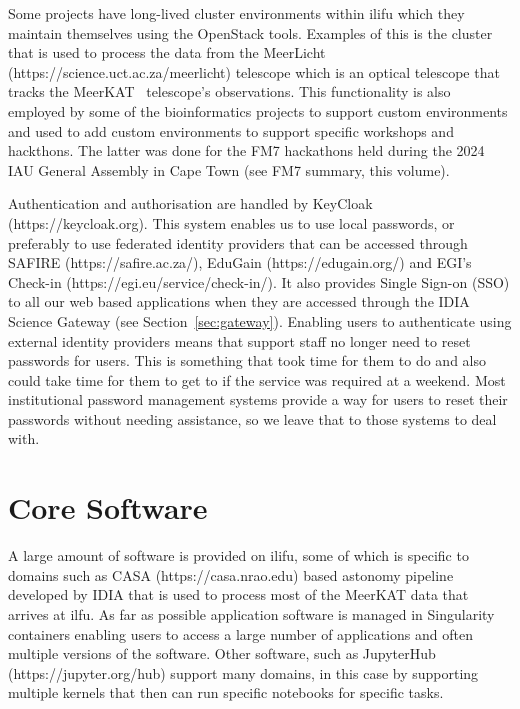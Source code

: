 \documentclass{iau_FM}
\begin{document}
Some projects have long-lived cluster environments within ilifu which they maintain themselves using
the OpenStack tools.
Examples of this is the cluster that is used to process the data from the MeerLicht
 (https://science.uct.ac.za/meerlicht) telescope which
is an optical telescope that tracks the MeerKAT~\cite{meerkat} telescope's observations. 
This functionality
is also employed
by some of the bioinformatics projects to support custom environments and used to add
custom environments to support specific workshops and hackthons. The latter was done for the
 FM7 hackathons held during the 2024 IAU General Assembly in Cape Town (see FM7 summary, this volume). 

Authentication and authorisation are handled by KeyCloak (https://keycloak.org). 
This system enables us 
to use local passwords,
or preferably to use federated identity providers that can be accessed through SAFIRE 
(https://safire.ac.za/), 
EduGain (https://edugain.org/) and EGI's Check-in (https://egi.eu/service/check-in/).
 It also provides Single Sign-on (SSO)
to all our 
web based applications when they are accessed through the 
IDIA Science Gateway (see Section~\ref{sec:gateway}).
Enabling users to authenticate using external identity providers means that support staff no longer need
to reset passwords for users. This is something that took time for them to do and also could take
time for them to get to if the service was required at a weekend. Most institutional password
management systems provide a way for users to reset their passwords without needing assistance,
so we leave that to those systems to deal with.

\section{Core Software}
\label{sec:core_software}

A large amount of software is provided on ilifu, some of which is specific to domains such as {\sc CASA}
(https://casa.nrao.edu) based
astonomy pipeline~\cite{pipelinepaper} 
developed by IDIA that is used to process most of the MeerKAT data that arrives
at {\sc ilfu}. As far as possible application software is managed in Singularity containers enabling users
to access a large number of applications and often multiple versions of the software. Other software, such
as JupyterHub (https://jupyter.org/hub) support many domains, in this case by 
supporting multiple
 kernels that then can run 
specific notebooks for specific tasks.
\end{document}
